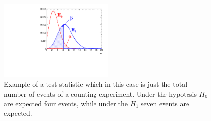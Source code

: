   

\begin{figure}[tp]
  \centering
 \includegraphics[width=0.5\textwidth]{figure/test_stat.pdf}
  \caption{Example of a test statistic which in this case is just the total number of events of a counting experiment.
	Under the hypotesis $H_0$ are expected four events, while under the $H_1$ seven  events are expected.} 
\label{fig:teststat}
\end{figure}

